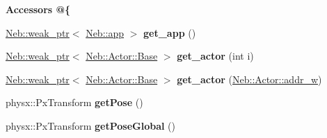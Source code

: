 \begin{Indent}{\bf \-Accessors @\{}\par
\begin{DoxyCompactItemize}
\item 
\hypertarget{classNeb_1_1Scene_1_1scene_a5d82ad91a702fdd805dee06de5d2170d}{\hyperlink{classNeb_1_1weak__ptr}{\-Neb\-::weak\-\_\-ptr}$<$ \hyperlink{classNeb_1_1app}{\-Neb\-::app} $>$ {\bfseries get\-\_\-app} ()}\label{classNeb_1_1Scene_1_1scene_a5d82ad91a702fdd805dee06de5d2170d}

\item 
\hypertarget{classNeb_1_1Scene_1_1scene_a6f5f594c8d387e1a44701e72b5738768}{\hyperlink{classNeb_1_1weak__ptr}{\-Neb\-::weak\-\_\-ptr}$<$ \hyperlink{classNeb_1_1Actor_1_1Base}{\-Neb\-::\-Actor\-::\-Base} $>$ {\bfseries get\-\_\-actor} (int i)}\label{classNeb_1_1Scene_1_1scene_a6f5f594c8d387e1a44701e72b5738768}

\item 
\hypertarget{classNeb_1_1Scene_1_1scene_a00d85affec775718c96426c46e7e41d1}{\hyperlink{classNeb_1_1weak__ptr}{\-Neb\-::weak\-\_\-ptr}$<$ \hyperlink{classNeb_1_1Actor_1_1Base}{\-Neb\-::\-Actor\-::\-Base} $>$ {\bfseries get\-\_\-actor} (\hyperlink{classNeb_1_1weak__ptr}{\-Neb\-::\-Actor\-::addr\-\_\-w})}\label{classNeb_1_1Scene_1_1scene_a00d85affec775718c96426c46e7e41d1}

\item 
\hypertarget{classNeb_1_1Scene_1_1scene_a31bbfb2549edb6966a04a8e159a85581}{physx\-::\-Px\-Transform {\bfseries get\-Pose} ()}\label{classNeb_1_1Scene_1_1scene_a31bbfb2549edb6966a04a8e159a85581}

\item 
\hypertarget{classNeb_1_1Scene_1_1scene_a55146fc4528a879e7956056650a5c180}{physx\-::\-Px\-Transform {\bfseries get\-Pose\-Global} ()}\label{classNeb_1_1Scene_1_1scene_a55146fc4528a879e7956056650a5c180}

\end{DoxyCompactItemize}
\end{Indent}
